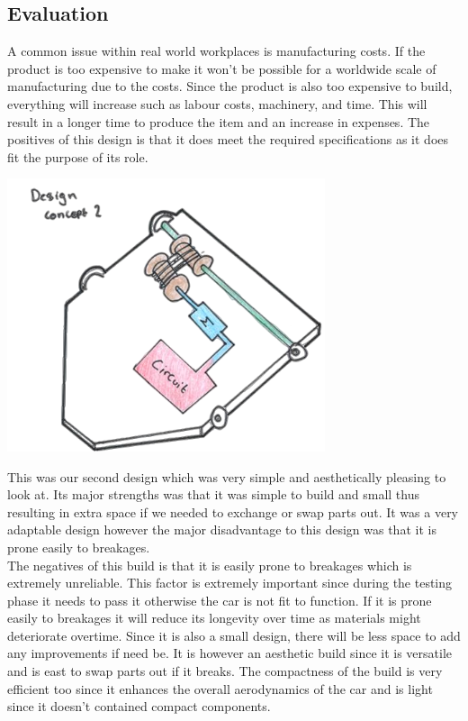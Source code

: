 \documentclass{article}
\begin{document}
\subsection{Evaluation}
A common issue within real world workplaces is manufacturing costs. If the product is too expensive to make it won’t be possible for a worldwide scale of manufacturing due to the costs. Since the product is also too expensive to build, everything will increase such as labour costs, machinery, and time. This will result in a longer time to produce the item and an increase in expenses. The positives of this design is that it does meet the required specifications as it does fit the purpose of its role.\\
\begin{center}
	\includegraphics[width=0.7\textwidth]{images/image_7_2-Photoroom.png}
\end{center}\vspace{0.6em}\noindent
This was our second design which was very simple and aesthetically pleasing to look at. Its major strengths was that it was simple to build and small thus resulting in extra space if we needed to exchange or swap parts out. It was a very adaptable design however the major disadvantage to this design was that it is prone easily to breakages.\\[1em]
The negatives of this build is that it is easily prone to breakages which is extremely unreliable. This factor is extremely important since during the testing phase it needs to pass it otherwise the car is not fit to function. If it is prone easily to breakages it will reduce its longevity over time as materials might deteriorate overtime. Since it is also a small design, there will be less space to add any improvements if need be. It is however an aesthetic build since it is versatile and is east to swap parts out if it breaks. The compactness of the build is very efficient too since it enhances the overall aerodynamics of the car and is light since it doesn’t contained compact components.
\end{document}
